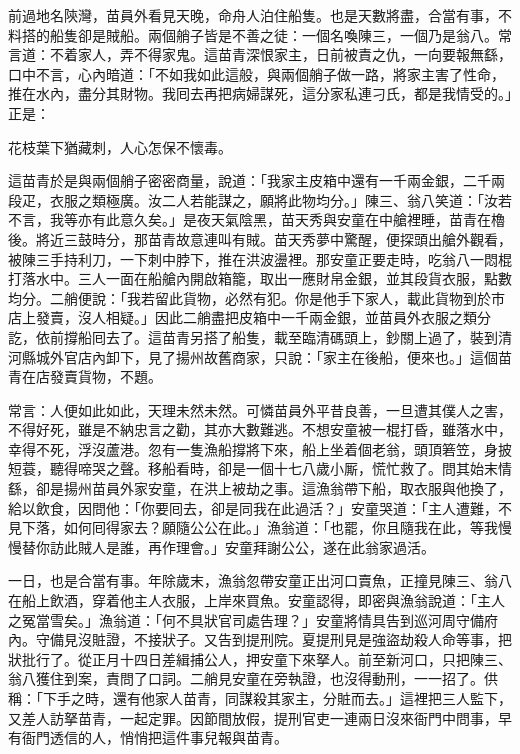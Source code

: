 前過地名陝灣，苗員外看見天晚，命舟人泊住船隻。也是天數將盡，合當有事，不料搭的船隻卻是賊船。兩個艄子皆是不善之徒：一個名喚陳三，一個乃是翁八。常言道：不着家人，弄不得家鬼。這苗青深恨家主，日前被責之仇，一向要報無繇，口中不言，心內暗道：「不如我如此這般，與兩個艄子做一路，將家主害了性命，推在水內，盡分其財物。我囘去再把病婦謀死，這分家私連刁氏，都是我情受的。」正是：

\begin{myquote}
花枝葉下猶藏刺，人心怎保不懷毒。
\end{myquote}

這苗青於是與兩個艄子密密商量，說道：「我家主皮箱中還有一千兩金銀，二千兩段疋，衣服之類極廣。汝二人若能謀之，願將此物均分。」陳三、翁八笑道：「汝若不言，我等亦有此意久矣。」是夜天氣陰黑，苗天秀與安童在中艙裡睡，苗青在櫓後。將近三鼓時分，那苗青故意連叫有賊。苗天秀夢中驚醒，便探頭出艙外觀看，被陳三手持利刀，一下刺中脖下，推在洪波盪裡。那安童正要走時，吃翁八一悶棍打落水中。三人一面在船艙內開啟箱籠，取出一應財帛金銀，並其段貨衣服，點數均分。二艄便說：「我若留此貨物，必然有犯。你是他手下家人，載此貨物到於市店上發賣，沒人相疑。」因此二艄盡把皮箱中一千兩金銀，並苗員外衣服之類分訖，依前撐船囘去了。這苗青另搭了船隻，載至臨清碼頭上，鈔關上過了，裝到清河縣城外官店內卸下，見了揚州故舊商家，只說：「家主在後船，便來也。」這個苗青在店發賣貨物，不題。

常言：人便如此如此，天理未然未然。可憐苗員外平昔良善，一旦遭其僕人之害，不得好死，雖是不納忠言之勸，其亦大數難逃。不想安童被一棍打昏，雖落水中，幸得不死，浮沒蘆港。忽有一隻漁船撐將下來，船上坐着個老翁，頭頂箬笠，身披短蓑，聽得啼哭之聲。移船看時，卻是一個十七八歲小厮，慌忙救了。問其始末情繇，卻是揚州苗員外家安童，在洪上被劫之事。這漁翁帶下船，取衣服與他換了，給以飲食，因問他：「你要囘去，卻是同我在此過活？」安童哭道：「主人遭難，不見下落，如何囘得家去？願隨公公在此。」漁翁道：「也罷，你且隨我在此，等我慢慢替你訪此賊人是誰，再作理會。」安童拜謝公公，遂在此翁家過活。

一日，也是合當有事。年除歲末，漁翁忽帶安童正出河口賣魚，正撞見陳三、翁八在船上飲酒，穿着他主人衣服，上岸來買魚。安童認得，即密與漁翁說道：「主人之冤當雪矣。」漁翁道：「何不具狀官司處告理？」安童將情具告到巡河周守備府內。守備見沒賍證，不接狀子。又告到提刑院。夏提刑見是強盜劫殺人命等事，把狀批行了。從正月十四日差緝捕公人，押安童下來拏人。前至新河口，只把陳三、翁八獲住到案，責問了口詞。二艄見安童在旁執證，也沒得動刑，一一招了。供稱：「下手之時，還有他家人苗青，同謀殺其家主，分賍而去。」這裡把三人監下，又差人訪拏苗青，一起定罪。因節間放假，提刑官吏一連兩日沒來衙門中問事，早有衙門透信的人，悄悄把這件事兒報與苗青。


